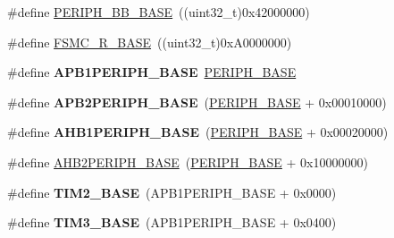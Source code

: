 \begin{DoxyCompactItemize}
\#define \hyperlink{group___peripheral__memory__map_gaed7efc100877000845c236ccdc9e144a}{P\-E\-R\-I\-P\-H\-\_\-\-B\-B\-\_\-\-B\-A\-S\-E}~((uint32\-\_\-t)0x42000000)
\item 
\#define \hyperlink{group___peripheral__memory__map_gaddf0e199dccba83272b20c9fb4d3aaed}{F\-S\-M\-C\-\_\-\-R\-\_\-\-B\-A\-S\-E}~((uint32\-\_\-t)0x\-A0000000)
\item 
\hypertarget{group___peripheral__memory__map_ga45666d911f39addd4c8c0a0ac3388cfb}{\#define {\bfseries A\-P\-B1\-P\-E\-R\-I\-P\-H\-\_\-\-B\-A\-S\-E}~\hyperlink{group___peripheral__memory__map_ga9171f49478fa86d932f89e78e73b88b0}{P\-E\-R\-I\-P\-H\-\_\-\-B\-A\-S\-E}}\label{group___peripheral__memory__map_ga45666d911f39addd4c8c0a0ac3388cfb}

\item 
\hypertarget{group___peripheral__memory__map_ga25b99d6065f1c8f751e78f43ade652cb}{\#define {\bfseries A\-P\-B2\-P\-E\-R\-I\-P\-H\-\_\-\-B\-A\-S\-E}~(\hyperlink{group___peripheral__memory__map_ga9171f49478fa86d932f89e78e73b88b0}{P\-E\-R\-I\-P\-H\-\_\-\-B\-A\-S\-E} + 0x00010000)}\label{group___peripheral__memory__map_ga25b99d6065f1c8f751e78f43ade652cb}

\item 
\hypertarget{group___peripheral__memory__map_ga811a9a4ca17f0a50354a9169541d56c4}{\#define {\bfseries A\-H\-B1\-P\-E\-R\-I\-P\-H\-\_\-\-B\-A\-S\-E}~(\hyperlink{group___peripheral__memory__map_ga9171f49478fa86d932f89e78e73b88b0}{P\-E\-R\-I\-P\-H\-\_\-\-B\-A\-S\-E} + 0x00020000)}\label{group___peripheral__memory__map_ga811a9a4ca17f0a50354a9169541d56c4}

\item 
\#define \hyperlink{group___peripheral__memory__map_gaeedaa71d22a1948492365e2cd26cfd46}{A\-H\-B2\-P\-E\-R\-I\-P\-H\-\_\-\-B\-A\-S\-E}~(\hyperlink{group___peripheral__memory__map_ga9171f49478fa86d932f89e78e73b88b0}{P\-E\-R\-I\-P\-H\-\_\-\-B\-A\-S\-E} + 0x10000000)
\item 
\hypertarget{group___peripheral__memory__map_ga00d0fe6ad532ab32f0f81cafca8d3aa5}{\#define {\bfseries T\-I\-M2\-\_\-\-B\-A\-S\-E}~(A\-P\-B1\-P\-E\-R\-I\-P\-H\-\_\-\-B\-A\-S\-E + 0x0000)}\label{group___peripheral__memory__map_ga00d0fe6ad532ab32f0f81cafca8d3aa5}

\item 
\hypertarget{group___peripheral__memory__map_gaf0c34a518f87e1e505cd2332e989564a}{\#define {\bfseries T\-I\-M3\-\_\-\-B\-A\-S\-E}~(A\-P\-B1\-P\-E\-R\-I\-P\-H\-\_\-\-B\-A\-S\-E + 0x0400)}\label{group___peripheral__memory__map_gaf0c34a518f87e1e505cd2332e989564a}


\end{DoxyCompactItemize}
